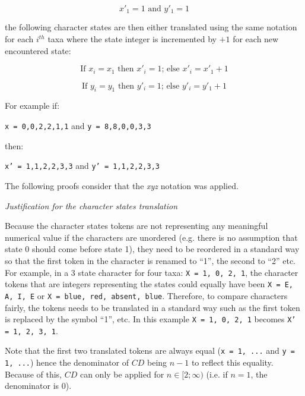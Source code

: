 \documentclass[12pt,letterpaper]{article}
\renewcommand{\subsection}[1]{%
\bigskip
\begin{center}
\begin{large}
\normalfont\itshape #1
\end{large}
\end{center}}
\begin{document}
\begin{equation}
x'_1 = 1 \text{ and } y'_1 = 1
\end{equation}

\noindent the following character states are then either translated using the same notation for each $i^{th}$ taxa where the state integer is incremented by $+1$ for each new encountered state:

\begin{equation}
\text{If } x_i = x_1 \text{ then } x'_i = 1 \text{; else } x'_i = x'_1 + 1
\end{equation}

\begin{equation}
\text{If } y_i = y_1 \text{ then } y'_i = 1 \text{; else } y'_i = y'_1 + 1
\end{equation}

\noindent For example if:

\texttt{x = {0,0,2,2,1,1}} and \texttt{y = {8,8,0,0,3,3}}

\noindent then:

\texttt{x' = {1,1,2,2,3,3}} and \texttt{y' = {1,1,2,2,3,3}}


\noindent The following proofs consider that the \textit{xyz} notation was applied.

\subsection{Justification for the character states translation}
Because the character states tokens are not representing any meaningful numerical value if the characters are unordered (e.g. there is no assumption that state 0 should come before state 1), they need to be reordered in a standard way so that the first token in the character is renamed to ``1'', the second to ``2'' etc.
For example, in a 3 state character for four taxa: \texttt{X = {1, 0, 2, 1}}, the character tokens that are integers representing the states could equally have been \texttt{X = {E, A, I, E}} or \texttt{X = {blue, red, absent, blue}}.
Therefore, to compare characters fairly, the tokens needs to be translated in a standard way such as the first token is replaced by the symbol ``1'', etc.
In this example \texttt{X = {1, 0, 2, 1}} becomes \texttt{X' = {1, 2, 3, 1}}.

Note that the first two translated tokens are always equal (\texttt{x = {1, ...}} and \texttt{y = {1, ...}}) hence the denominator of $CD$ being $n - 1$ to reflect this equality.
Because of this, $CD$ can only be applied for $n \in [2;\infty)$ (i.e. if $n = 1$, the denominator is 0).
\end{document}
